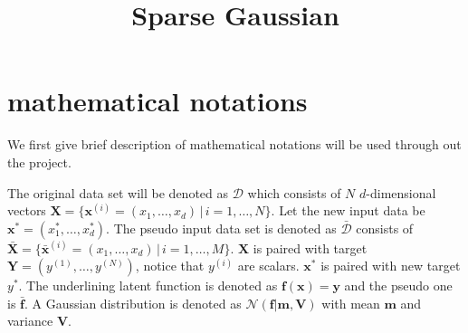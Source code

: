 \documentclass[10pt,a4paper]{article}
\title{Sparse Gaussian}
\begin{document}
\maketitle
\section{mathematical notations}
We first give brief description of mathematical notations will be used through out the project.

The original data set will be denoted as $\mathcal{D}$ which consists of $N$ $d$-dimensional vectors $\pmb{X}=\lbrace\pmb{x}^{(i)}=(x_1,\dots,x_d)\,|\, i=1,\dots,N\rbrace$. Let the new input data be $\pmb{x}^{*}=(x^*_1,\dots,x^*_d)$. The pseudo input data set is denoted as $\bar{\mathcal{D}}$ consists of $\bar{\pmb{X}}=\lbrace\pmb{\bar{x}}^{(i)}=(x_1,\dots,x_d)\,|\,i=1,\dots,M\rbrace$. $\pmb{X}$ is paired with target $\pmb{Y}=(y^{(1)},\dots,y^{(N)})$, notice that $y^{(i)}$ are scalars. $\pmb{x}^*$ is paired with new target $y^*$. The underlining latent function is denoted as $\pmb{f}(\pmb{x})=\pmb{y}$ and the pseudo one is $\bar{\pmb{f}}$. A Gaussian distribution is denoted as $\mathcal{N}(\pmb{f}|\pmb{m},\pmb{V})$ with mean $\pmb{m}$ and variance $\pmb{V}$.
\end{document}
